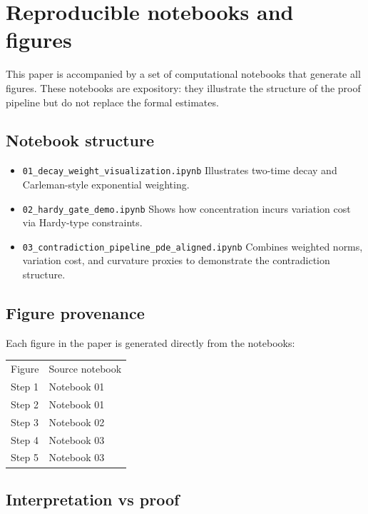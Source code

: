 \section{Reproducible notebooks and figures}

This paper is accompanied by a set of computational notebooks that generate all figures.
These notebooks are expository: they illustrate the structure of the proof pipeline but do not replace the formal estimates.

\subsection{Notebook structure}

\begin{itemize}
\item \texttt{01\_decay\_weight\_visualization.ipynb}  
Illustrates two-time decay and Carleman-style exponential weighting.

\item \texttt{02\_hardy\_gate\_demo.ipynb}  
Shows how concentration incurs variation cost via Hardy-type constraints.

\item \texttt{03\_contradiction\_pipeline\_pde\_aligned.ipynb}  
Combines weighted norms, variation cost, and curvature proxies to demonstrate the contradiction structure.
\end{itemize}

\subsection{Figure provenance}

Each figure in the paper is generated directly from the notebooks:

\begin{center}
\begin{tabular}{ll}
Figure & Source notebook \\
Step 1 & Notebook 01 \\
Step 2 & Notebook 01 \\
Step 3 & Notebook 02 \\
Step 4 & Notebook 03 \\
Step 5 & Notebook 03 \\
\end{tabular}
\end{center}

\subsection{Interpretation vs proof}

